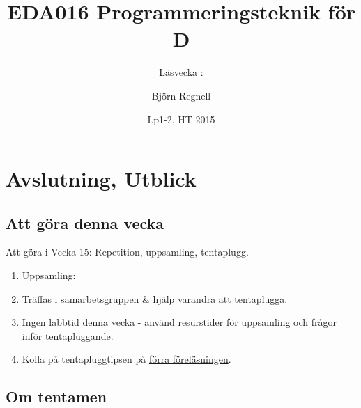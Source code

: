 \documentclass{lecturenotes}
\title[Föreläsningsanteckningar EDA016, 2015]{EDA016 Programmeringsteknik för D}
\subtitle{Läsvecka \vecka: \tema}
\author{Björn Regnell}
\institute{Datavetenskap, LTH}
\date{Lp1-2, HT 2015}
\renewcommand{\vecka}{15}
\newcommand{\tema}{Avslutning, Utblick}
\begin{document}
\frame{\titlepage}
\setnextsection{\vecka}
\section[Vecka \vecka: \tema]{\tema}
\frame{\tableofcontents}

\subsection{Att göra denna vecka}
\begin{Slide}{Att göra i Vecka \vecka: Repetition, uppsamling, tentaplugg.}
\begin{enumerate}
\item Uppsamling: 
\item Träffas i samarbetsgruppen \& hjälp varandra att tentaplugga.
\item Ingen labbtid denna vecka - använd resurstider för uppsamling och frågor inför tentapluggande.
\item Kolla på tentapluggtipsen på \href{https://github.com/bjornregnell/lth-eda016-2015/blob/master/lectures/notes/week14.pdf}{förra föreläsningen}.
\end{enumerate}
\end{Slide}

\subsection{Om tentamen}
\end{document}
